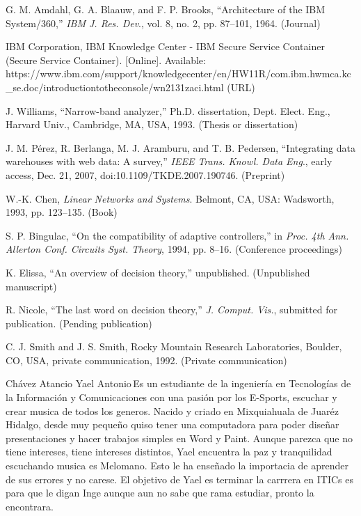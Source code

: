 \documentclass{IEEEcsmag}
\begin{document}
\begin{thebibliography}{1}

G. M. Amdahl, G. A. Blaauw, and F. P. Brooks, ``Architecture of the IBM System/360,'' {\it IBM J. Res. Dev}., vol. 8, no. 2, pp. 87--101, 1964. (Journal)

IBM Corporation, IBM Knowledge Center - IBM Secure Service Container (Secure Service Container). [Online]. Available: {https://www.ibm.com/support/\break knowledgecenter/en/HW11R/com.ibm.hwmca.kc\_se.doc/\break introductiontotheconsole/wn2131zaci.html} (URL)

J. Williams, ``Narrow-band analyzer,'' Ph.D. dissertation, Dept.  Elect. Eng., Harvard Univ., Cambridge, MA, USA, 1993. (Thesis or dissertation)

J. M. P\'erez, R. Berlanga, M. J. Aramburu, and T. B. Pedersen, ``Integrating data warehouses with web data: A survey,'' {\it IEEE Trans. Knowl. Data Eng}., early access, Dec. 21, 2007, doi:10.1109/TKDE.2007.190746. (Preprint)

W.-K. Chen, {\it Linear Networks and Systems}. Belmont, CA, USA: Wadsworth,  1993, pp. 123--135. (Book)

S. P. Bingulac, ``On the compatibility of adaptive controllers,'' in {\it Proc. 4th Ann. Allerton Conf. Circuits Syst. Theory}, 1994,  pp. 8--16. (Conference proceedings)

K. Elissa, ``An overview of decision theory,'' unpublished. (Unpublished manuscript)

R. Nicole, ``The last word on decision theory,'' {\it J. Comput. Vis.}, submitted for publication. (Pending publication)

C. J. Smith and J. S. Smith, Rocky Mountain Research Laboratories, Boulder, CO, USA, private communication, 1992. (Private communication)
\end{thebibliography}\vspace*{-8pt}


\begin{IEEEbiography}{Chávez Atancio Yael Antonio}{\,}Es un estudiante de la ingeniería en Tecnologías de la Información y Comunicaciones con una pasión por los E-Sports, escuchar y crear musica de todos los generos. Nacido y criado en Mixquiahuala de Juaréz Hidalgo, desde muy pequeño quiso tener una computadora para poder diseñar presentaciones y hacer trabajos simples en Word y Paint. Aunque parezca que no tiene intereses, tiene intereses distintos, Yael encuentra la paz y tranquilidad escuchando musica es Melomano. Esto le ha enseñado la importacia de aprender de sus errores y no carese. El objetivo de Yael es terminar la carrrera  en ITICs es para que le digan Inge aunque aun no sabe que rama estudiar, pronto la encontrara.
\end{IEEEbiography}
\end{document}
